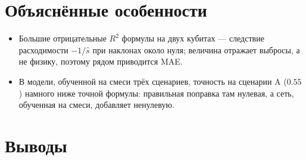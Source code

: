 \documentclass[12pt,a4paper]{report}
\numberwithin{equation}{chapter}
\begin{document}
\section{Объяснённые особенности}

\begin{itemize}
\item Большие отрицательные $R^2$ формулы на двух кубитах --- следствие
      расходимости $-1/\hat s$ при наклонах около нуля; величина отражает
      выбросы, а не физику, поэтому рядом приводится MAE.
\item В модели, обученной на смеси трёх сценариев, точность на сценарии A
      ($0.55$) намного ниже точной формулы: правильная поправка там нулевая,
      а сеть, обученная на смеси, добавляет ненулевую.
\end{itemize}

\section{Выводы}
\end{document}
